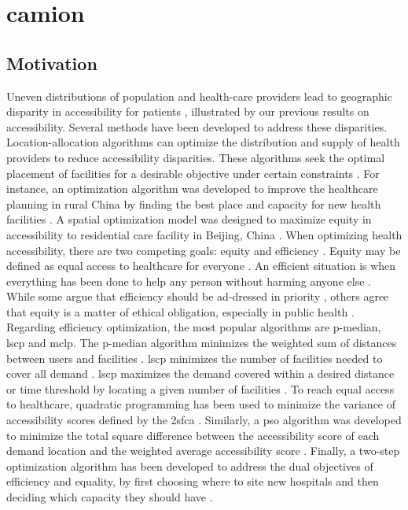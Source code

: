 \chapter{\acf{camion}}

\section{Motivation}

Uneven distributions of population and health-care providers lead to geographic
disparity in accessibility for patients \cite{wang_why_2020}, illustrated by our
previous results on accessibility. Several methods have been developed to
address these disparities. Location-allocation algorithms
\cite{church_location_1999} can optimize the distribution and supply of health
providers to reduce accessibility disparities. These algorithms seek the optimal
placement of facilities for a desirable objective under certain constraints
\cite{wang_measurement_2012}. For instance, an optimization algorithm  was
developed to improve the healthcare planning in rural China by finding the best
place and capacity for new health facilities \cite{luo_integrating_2014}.
A spatial optimization model was designed to maximize equity in accessibility
to residential care facility in Beijing, China \cite{tao_spatial_2014}. When
optimizing health accessibility, there are two competing goals: equity and
efficiency \cite{krugman_opinion_2013,meyer_equity_2008}. Equity may be defined
as equal access to healthcare for everyone \cite{culyer_equity_1993}. An
efficient situation is when everything has been done to help any person without
harming anyone else \cite{hemenway_optimal_1982}. While some argue that
efficiency should be ad-dressed in priority \cite{hemenway_optimal_1982}, others
agree that equity is a matter of ethical obligation, especially in public health
\cite{fried_rights_1975, oliver_equity_2004}. Regarding efficiency optimization,
the most popular algorithms are p-median, \ac{lscp} and \ac{mclp}. The p-median
algorithm minimizes the weighted sum of distances between users and facilities
\cite{murad_using_2021}. \ac{lscp} minimizes the number of facilities needed to
cover all demand \cite{shavandi_fuzzy_2006}. \ac{lscp} maximizes the demand
covered within a desired distance or time threshold by locating a given number
of facilities \cite{casado_heuristical_2005}. To reach equal access to
healthcare, quadratic programming has been used to  minimize the variance of
accessibility scores defined by the \ac{2sfca} \cite{wang_planning_2013}.
Similarly, a \ac{pso} algorithm was developed to minimize the total square
difference between the accessibility score of each demand location and the
weighted average accessibility score \cite{tao_spatial_2014}. Finally, a
two-step optimization algorithm has been developed to address the dual
objectives of efficiency and equality, by first choosing where to site new
hospitals and then deciding which capacity they should have
\cite{luo_two-step_2017,li_two-step_2017}.

